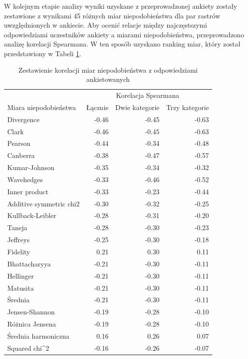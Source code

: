 \documentclass{amuthesis}
\begin{document}
W kolejnym etapie analizy wyniki uzyskane z przeprowadzonej ankiety
zostały zestawione z wynikami 45 różnych miar niepodobieństwa dla par
rastrów uwzględnionych w ankiecie. Aby ocenić relacje między
najczęstszymi odpowiedziami uczestników ankiety a miarami
niepodobieństwa, przeprowadzono analizę korelacji Spearmana. W ten
sposób uzyskano ranking miar, który został przedstawiony w Tabeli
\ref{tbl-corr_df}.

\hypertarget{tbl-corr_df}{}
\begin{table}
\caption{\label{tbl-corr_df}Zestawienie korelacji miar niepodobieństwa z odpowiedziami ankietowanych }\tabularnewline

\centering
\begin{tabular}{>{\raggedright\arraybackslash}p{4.5cm}rrr}
\toprule
\multicolumn{1}{c}{ } & \multicolumn{3}{c}{Korelacja Spearmana} \\
\cmidrule(l{3pt}r{3pt}){2-4}
Miara niepodobieństwa & Łącznie & Dwie kategorie & Trzy kategorie\\
\midrule
Divergence & -0.46 & -0.45 & -0.63\\
Clark & -0.46 & -0.45 & -0.63\\
Pearson & -0.44 & -0.34 & -0.48\\
Canberra & -0.38 & -0.47 & -0.57\\
Kumar-Johnson & -0.35 & -0.34 & -0.32\\
\addlinespace
Wavehedges & -0.33 & -0.46 & -0.52\\
Inner product & -0.33 & -0.23 & -0.44\\
Additive symmetric chi2 & -0.30 & -0.32 & -0.25\\
Kullback-Leibler & -0.28 & -0.31 & -0.20\\
Taneja & -0.28 & -0.30 & -0.23\\
\addlinespace
Jeffreys & -0.25 & -0.30 & -0.18\\
Fidelity & 0.21 & 0.30 & 0.11\\
Bhattacharyya & -0.21 & -0.30 & -0.11\\
Hellinger & -0.21 & -0.30 & -0.11\\
Matusita & -0.21 & -0.30 & -0.11\\
\addlinespace
Średnia & -0.21 & -0.30 & -0.11\\
Jensen-Shannon & -0.19 & -0.28 & -0.10\\
Różnica Jensena & -0.19 & -0.28 & -0.10\\
Średnia harmoniczna & 0.16 & 0.26 & 0.07\\
Squared chi\textasciicircum{}2 & -0.16 & -0.26 & -0.07\\

\end{tabular}
\end{table}
\end{document}
